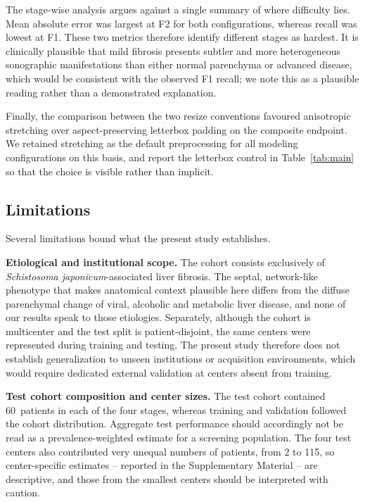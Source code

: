 The stage-wise analysis argues against a single summary of where difficulty
lies. Mean absolute error was largest at F2 for both configurations, whereas
recall was lowest at F1. These two metrics therefore identify different stages
as hardest. It is clinically plausible that mild fibrosis presents subtler and
more heterogeneous sonographic
manifestations than either normal parenchyma or advanced disease, which would be
consistent with the observed F1 recall; we note this as a plausible reading
rather than a demonstrated explanation.

Finally, the comparison between the two resize conventions favoured anisotropic
stretching over aspect-preserving letterbox padding on the composite endpoint.
We retained stretching as the default preprocessing for all modeling
configurations on this basis, and report the letterbox control in
Table~\ref{tab:main} so that the choice is visible rather than implicit.

\subsection{Limitations}

Several limitations bound what the present study establishes.

\textbf{Etiological and institutional scope.} The cohort consists exclusively of
\emph{Schistosoma japonicum}-associated liver fibrosis. The septal, network-like
phenotype that makes anatomical context plausible here differs from the diffuse
parenchymal change of viral, alcoholic and metabolic liver disease, and none of
our results speak to those etiologies. Separately, although the cohort is
multicenter and the test split is patient-disjoint, the same centers were
represented during training and testing. The present study therefore does not
establish generalization to unseen institutions or acquisition environments,
which would require dedicated external validation at centers absent from
training.

\textbf{Test cohort composition and center sizes.} The test cohort contained
60~patients in each of the four stages, whereas training and validation followed
the cohort distribution. Aggregate test performance should accordingly not be
read as a prevalence-weighted estimate for a screening population. The four test
centers also contributed very unequal numbers of patients, from 2 to 115, so
center-specific estimates -- reported in the Supplementary Material -- are
descriptive, and those from the smallest centers should be interpreted with
caution.

